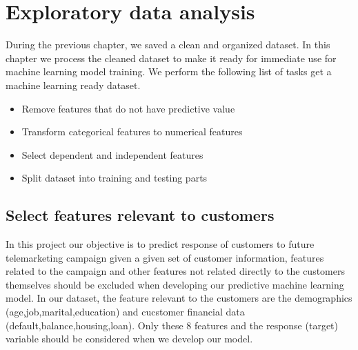\chapter{Exploratory data analysis}
During the previous chapter, we saved a clean and organized dataset. In this chapter we process the cleaned dataset to make it ready for immediate use for machine learning model training. We perform the following list of tasks get a machine learning ready dataset. 
\begin{itemize}
    \item  Remove features that do not have predictive value
    \item Transform categorical features to numerical features
    \item Select dependent and independent features 
    \item Split dataset into training and testing parts
\end{itemize}

\section{Select features relevant to customers}
In this project our objective is to predict response of customers to future telemarketing campaign given a given set of customer information, features related to the campaign and other features not related directly to the customers themselves should be excluded when developing our predictive machine learning model. In our dataset, the feature relevant to the customers are the demographics (age,job,marital,education) and cucstomer financial data (default,balance,housing,loan). Only these 8 features and the response (target) variable should be considered when we develop our model. 

